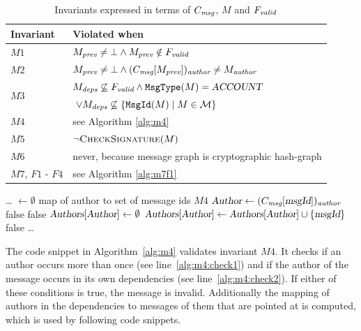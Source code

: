 \documentclass{article}
\begin{document}
\begin{table}
\begin{tabular}{|l|l|}
\hline
\textbf{Invariant} & \textbf{Violated when} \\
\hline
$M1$ & $M_\emph{prev} \ne \bot \wedge M_\emph{prev} \notin F_\emph{valid}$\\ \hline
$M2$ & $M_\emph{prev} \neq \bot \wedge (C_\emph{msg}[M_\emph{prev}])_\emph{author} \ne M_\emph{author}$\\ \hline
\multirow{2}{*}{$M3$} & $M_\emph{deps} \not\subseteq F_\emph{valid} \land \texttt{MsgType}(M) = \textsl{ACCOUNT}$ \\
& $\ \lor M_\emph{deps} \not\subseteq \{\texttt{MsgId}(M) \mid M \in \mathcal M\}$ \\ \hline
$M4$ & see Algorithm \ref{alg:m4}\\ \hline
$M5$ & $\lnot\Call{CheckSignature}{M}$\\ \hline
$M6$ & never, because message graph is cryptographic hash-graph \\ \hline
$M7$, $F1$ - $F4$ & see Algorithm \ref{alg:m7f1} \\ \hline
\hline
\end{tabular}
\caption{Invariants expressed in terms of $C_\emph{msg}$, $M$ and $F_\emph{valid}$}
\label{tab:invariant-code-msg}
\end{table}

\begin{algorithm}[ht]
\caption{Code snippet verifying $M4$}
    \label{alg:m4}
\begin{algorithmic}[1]
    \Statex \ldots \vphantom{I}
    \State {} $\gets \emptyset$ \Comment map of author to set of message ids
     \Comment $M4$
        \State $\textsl{Author} \gets (C_\emph{msg}[\textsl{msgId}])_\emph{author}$
             \label{alg:m4:check1}
                \State \Return false
            \EndIf
             \label{alg:m4:check2}
                \State \Return false
            \EndIf
        \EndIf
            \State $\textsl{Authors}[\textsl{Author}] \gets \emptyset$
        \EndIf
        \State $\textsl{Authors}[\textsl{Author}] \gets \textsl{Authors}[\textsl{Author}] \cup \{\textsl{msgId}\}$
            \State \Return false
        \EndIf
    \EndFor
    \Statex \ldots \vphantom{I}
\end{algorithmic}
\end{algorithm}
The code snippet in Algorithm~\ref{alg:m4} validates invariant $M4$. It checks if an author occurs more than once (see line~\ref{alg:m4:check1}) and if the author of the message occurs in its own dependencies (see line~\ref{alg:m4:check2}). If either of these conditions is true, the message is invalid. Additionally the mapping  of authors in the dependencies to messages of them that are pointed at is computed, which is used by following code snippets.
\end{document}
